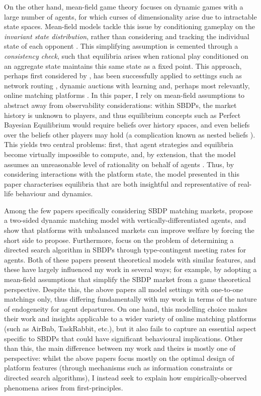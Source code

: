 On the other hand, mean-field game theory focuses on dynamic games with a large number of agents, for which curses of dimensionality arise due to intractable state spaces. 
Mean-field models tackle this issue by conditioning gameplay on the \textit{invariant state distribution}, rather than considering and tracking the individual state of each opponent \citep{light2022mean}.
This simplifying assumption is cemented through a \textit{consistency check}, such that equilibria arises when rational play conditioned on an aggregate state maintains this same state as a fixed point. 
This approach, perhaps first considered by \cite{jovanovic1988anonymous}, has been successfully applied to settings such as network routing \citep{calderone2017markov}, dynamic auctions with learning \citep{iyer2014mean} and, perhaps most relevantly, online matching platforms \citep{kanoria2021facilitating,immorlica2021designing}.
In this paper, I rely on mean-field assumptions to abstract away from observability considerations: within SBDPs, the market history is unknown to players, and thus equilibrium concepts such as Perfect Bayesian Equilibrium would require beliefs over history spaces, and even beliefs over the beliefs other players may hold (a complication known as nested beliefs \citep{brandenburger1993hierarchies}).
This yields two central problems: first, that agent strategies and equilibria become virtually impossible to compute, and, by extension, that the model assumes an unreasonable level of rationality on behalf of agents \citep{iyer2014mean}.
Thus, by considering interactions with the platform state, the model presented in this paper characterises equilibria that are both insightful and representative of real-life behaviour and dynamics. 

Among the few papers specifically considering SBDP matching markets, \cite{kanoria2021facilitating} propose a two-sided dynamic matching model with vertically-differentiated agents, and show that platforms with unbalanced markets can improve welfare by forcing the short side to propose. 
Furthermore, \cite{immorlica2021designing} focus on the problem of determining a directed search algorithm in SBDPs through type-contingent meeting rates for agents. 
Both of these papers present theoretical models with similar features, and these have largely influenced my work in several ways; for example, by adopting a mean-field assumptions that simplify the SBDP market from a game theoretical perspective. 
Despite this, the above papers all model settings with one-to-one matchings only, thus differing fundamentally with my work in terms of the nature of endogeneity for agent departures. On one hand, this modelling choice makes their work and insights applicable to a wider variety of online matching platforms (such as AirBnb, TaskRabbit, etc.), but it also fails to capture an essential aspect specific to SBDPs that could have significant behavioural implications. Other than this, the main difference between my work and theirs is mostly one of perspective: whilst the above papers focus mostly on the optimal design of platform features (through mechanisms such as information constraints or directed search algorithms), I instead seek to explain how empirically-observed phenomena arises from first-principles.